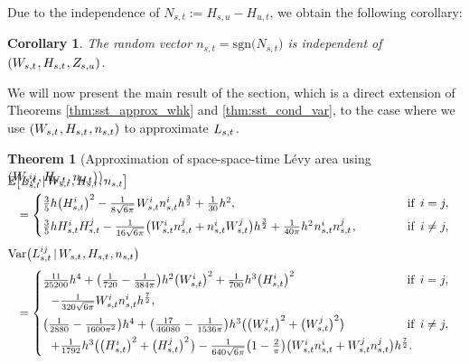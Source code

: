\documentclass[sn-mathphys-num]{sn-jnl}%
\newtheorem{theorem}{Theorem}%
\newtheorem{corollary}{Corollary}
\newcommand{\E}{\mathbb{E}}
\newcommand{\m}{\hspace{0.25mm}}
\newcommand{\var}{\mathrm{Var}}
\newcommand{\sgn}{\mathrm{sgn}}
\begin{document}
Due to the independence of $N_{s,t} := H_{s,u} - H_{u,t}$, we obtain the following corollary:\medbreak
\begin{corollary}
The random vector $n_{s,t} =  \sgn\big(N_{s,t}\big)$ is independent of $(W_{s,t}\m, H_{s,t}\m, Z_{s,u})$.
\end{corollary}
\medbreak
We will now present the main result of the section, which is a direct extension of Theorems \ref{thm:sst_approx_whk} and \ref{thm:sst_cond_var}, to the case where we use $(W_{s,t}\m, H_{s,t}\m, n_{s,t})$ to approximate $L_{s,t}\m$.
\medbreak
\begin{theorem}[Approximation of space-space-time L\'{e}vy area using $(W_{s,t}\m, H_{s,t}\m, n_{s,t})$]\label{thm:sst_with_swing}
\begin{align}
\nonumber\\[-32pt]
&\E\big[L_{s,t}^{ij} \,|\, W_{s,t}\m, H_{s,t}\m, n_{s,t}\big]\label{eq:sst_exp_whn}\\
&\hspace{2.5mm} = \begin{cases}  \frac{3}{5}h\big(H_{s,t}^i\big)^2 - \frac{1}{8\sqrt{6\pi}}\m W_{s,t}^i n_{s,t}^i h^\frac{3}{2} + \frac{1}{30} h^2, &\hspace{11.75mm} \text{if }\,i = j,\\[5pt]
\frac{3}{5}h H_{s,t}^i H_{s,t}^j - \frac{1}{16\sqrt{6\pi}}\big(W_{s,t}^i n_{s,t}^j + n_{s,t}^i W_{s,t}^j\big)h^\frac{3}{2} + \frac{1}{40\pi}h^2\m n_{s,t}^i n_{s,t}^j\m, &\hspace{11.75mm} \text{if }\,i\neq j,\end{cases}\nonumber\\[4pt]
&\var\big(L_{s,t}^{ij} \,|\, W_{s,t}\m, H_{s,t}\m, n_{s,t}\big)\label{eq:sst_var_whn}\\[3pt]
&\hspace{2.5mm} = \begin{cases} \frac{11}{25200} h^4  + \big(\frac{1}{720} - \frac{1}{384\pi}\big)h^2\big(W_{s,t}^i\big)^2 + \frac{1}{700}h^3 \big(H_{s,t}^i\big)^2 & \hspace*{-5mm} \text{if }\,i = j,\\[3pt]
\,\,\,\, - \frac{1}{320\sqrt{6\pi}} W_{s,t}^i n_{s,t}^i h^\frac{7}{2}, & \\[5pt]
\big(\frac{1}{2880} - \frac{1}{1600\pi^2}\big) h^4 + \big(\frac{17}{46080} - \frac{1}{1536\pi}\big)h^3\big(\big(W_{s,t}^i\big)^2 + \big(W_{s,t}^j\big)^2\big) & \hspace*{-5mm}\text{if }\,i\neq j,\\[3pt]
\,\,\,\, + \frac{1}{1792}h^3\big(\big(H_{s,t}^i\big)^2 + \big(H_{s,t}^j\big)^2\m\big) - \frac{1}{640\sqrt{6\pi}}\big(1 - \frac{2}{\pi}\big)\big(W_{s,t}^i n_{s,t}^i + W_{s,t}^j n_{s,t}^j\big)h^\frac{7}{2}. &\end{cases}\nonumber
\end{align}
\end{theorem}
\end{document}
